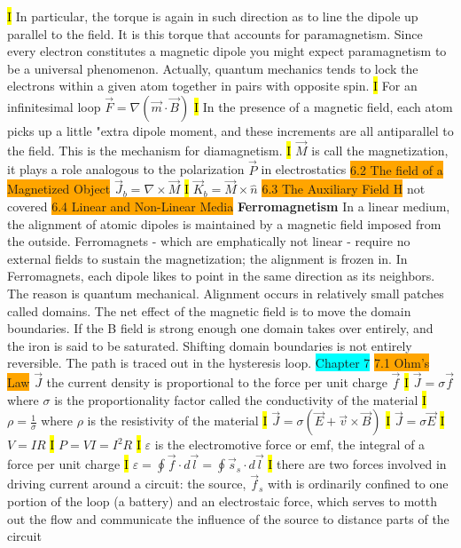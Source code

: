 \documentclass[fontsize=4pt]{scrartcl}
\begin{document}
\hl{I}
In particular, the torque is again in such direction as to line the dipole up parallel to the field. It is this torque that accounts for paramagnetism. Since every electron constitutes a magnetic dipole you might expect paramagnetism to be a universal phenomenon. Actually, quantum mechanics tends to lock the electrons within a given atom together in pairs with opposite spin. 
\hl{I}
For an infinitesimal loop $\vec{F} = \nabla (\vec{m} \cdot \vec{B})$
\hl{I}
In the presence of a magnetic field, each atom picks up a little "extra dipole moment, and these increments are all antiparallel to the field. This is the mechanism for diamagnetism. 
\hl{I}
$\vec{M}$ is call the magnetization, it plays a role analogous to the polarization $\vec{P}$ in electrostatics 
\colorbox{Orange}{6.2 The field of a Magnetized Object}
$\vec{J}_ b = \nabla \times \vec{M}$
\hl{I}
$\vec{K}_b = \vec{M} \times \hat{n}$
\colorbox{Orange}{6.3 The Auxiliary Field H}
not covered
\colorbox{Orange}{6.4 Linear and Non-Linear Media}
\textbf{Ferromagnetism}
In a linear medium, the alignment of atomic dipoles is maintained by a magnetic field imposed from the outside. Ferromagnets - which are emphatically not linear - require no external fields to sustain the magnetization; the alignment is frozen in. In Ferromagnets, each dipole likes to point in the same direction as its neighbors. The reason is quantum mechanical. Alignment occurs in relatively small patches called domains. The net effect of the magnetic field is to move the domain boundaries. If the B field is strong enough one domain takes over entirely, and the iron is said to be saturated. Shifting domain boundaries is not entirely reversible. The path is traced out in the hysteresis loop.  
\colorbox{Cyan}{Chapter 7}
\colorbox{Orange}{7.1 Ohm's Law}
$\vec{J}$ the current density is proportional to the force per unit charge $\vec{f}$
\hl{I}
$\vec{J} = \sigma \vec{f}$ where $\sigma$ is the proportionality factor called the conductivity of the material
\hl{I}
$\rho = \frac{1}{\sigma}$ where $\rho$ is the resistivity of the material
\hl{I}
$\vec{J} = \sigma (\vec{E} + \vec{v} \times \vec{B})$
\hl{I}
$\vec{J} = \sigma \vec{E}$
\hl{I}
$V=IR$
\hl{I}
$P = VI = I^2R$
\hl{I}
$\varepsilon$ is the electromotive force or emf, the integral of a force per unit charge
\hl{I}
$\varepsilon = \oint \vec{f} \cdot d\vec{l} = \oint \vec{s}_s \cdot d\vec{l}$
\hl{I}
there are two forces involved in driving current around a circuit: the source, $\vec{f}_s$ with is ordinarily confined to one portion of the loop (a battery) and an electrostaic force, which serves to motth out the flow and communicate the influence of the source to distance parts of the circuit
\end{document}
